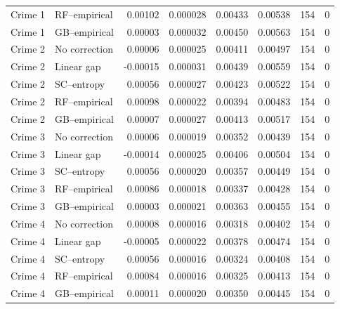 \begin{longtable}{llrrrrrr}
Crime 1 & RF--empirical & 0.00102 & 0.000028 & 0.00433 & 0.00538 & 154 & 0\\
Crime 1 & GB--empirical & 0.00003 & 0.000032 & 0.00450 & 0.00563 & 154 & 0\\
\midrule
Crime 2 & No correction & 0.00006 & 0.000025 & 0.00411 & 0.00497 & 154 & 0\\
Crime 2 & Linear gap & -0.00015 & 0.000031 & 0.00439 & 0.00559 & 154 & 0\\
Crime 2 & SC--entropy & 0.00056 & 0.000027 & 0.00423 & 0.00522 & 154 & 0\\
Crime 2 & RF--empirical & 0.00098 & 0.000022 & 0.00394 & 0.00483 & 154 & 0\\
Crime 2 & GB--empirical & 0.00007 & 0.000027 & 0.00413 & 0.00517 & 154 & 0\\
\midrule
Crime 3 & No correction & 0.00006 & 0.000019 & 0.00352 & 0.00439 & 154 & 0\\
Crime 3 & Linear gap & -0.00014 & 0.000025 & 0.00406 & 0.00504 & 154 & 0\\
Crime 3 & SC--entropy & 0.00056 & 0.000020 & 0.00357 & 0.00449 & 154 & 0\\
Crime 3 & RF--empirical & 0.00086 & 0.000018 & 0.00337 & 0.00428 & 154 & 0\\
Crime 3 & GB--empirical & 0.00003 & 0.000021 & 0.00363 & 0.00455 & 154 & 0\\
\midrule
Crime 4 & No correction & 0.00008 & 0.000016 & 0.00318 & 0.00402 & 154 & 0\\
Crime 4 & Linear gap & -0.00005 & 0.000022 & 0.00378 & 0.00474 & 154 & 0\\
Crime 4 & SC--entropy & 0.00056 & 0.000016 & 0.00324 & 0.00408 & 154 & 0\\
Crime 4 & RF--empirical & 0.00084 & 0.000016 & 0.00325 & 0.00413 & 154 & 0\\
Crime 4 & GB--empirical & 0.00011 & 0.000020 & 0.00350 & 0.00445 & 154 & 0\\
\bottomrule
\end{longtable}
